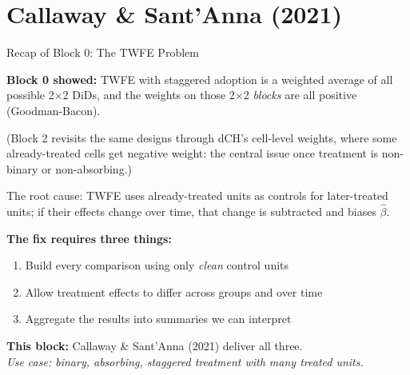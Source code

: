 \documentclass[main.tex]{subfiles}
\begin{document}
\section{Callaway \& Sant'Anna (2021)}

\begin{frame}{Recap of Block 0: The TWFE Problem}

  \textbf{Block 0 showed:} TWFE with staggered adoption is a weighted
  average of all possible 2$\times$2 DiDs, and the weights on those
  2$\times$2 \emph{blocks} are all positive (Goodman-Bacon).

  \medskip
  (Block 2 revisits the same designs through dCH's cell-level weights, where
  some already-treated cells get \alert{negative} weight: the central issue
  once treatment is non-binary or non-absorbing.)

  \medskip
  The root cause: TWFE uses \alert{already-treated units as controls}
  for later-treated units; if their effects change over time, that change
  is subtracted and biases $\hat{\beta}$.

  \bigskip
  \textbf{The fix requires three things:}
  \begin{enumerate}
    \item Build every comparison using only \emph{clean} control units
    \item Allow treatment effects to differ across groups and over time
    \item Aggregate the results into summaries we can interpret
  \end{enumerate}

  \bigskip
  \textbf{This block:} Callaway \& Sant'Anna (2021) deliver all three.\\
  \textit{Use case: binary, absorbing, staggered treatment with
    many treated units.}

\end{frame}
\end{document}
